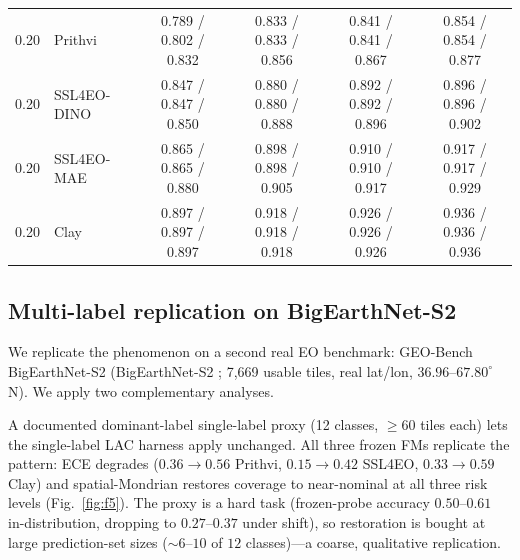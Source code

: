 \documentclass[preprint,11pt,authoryear]{elsarticle}
\begin{document}
\begin{table}[htbp]
{\begin{tabular}{clcccc}
\midrule
0.20 & Prithvi & 0.789 / 0.802 / 0.832\rlap{$^{\dagger}$} & 0.833 / 0.833 / 0.856\rlap{$^{\dagger}$} & 0.841 / 0.841 / 0.867\rlap{$^{\dagger}$} & 0.854 / 0.854 / 0.877\rlap{$^{\dagger}$} \\
0.20 & SSL4EO-DINO & 0.847 / 0.847 / 0.850\rlap{$^{\dagger}$} & 0.880 / 0.880 / 0.888\rlap{$^{\dagger}$} & 0.892 / 0.892 / 0.896\rlap{$^{\dagger}$} & 0.896 / 0.896 / 0.902\rlap{$^{\dagger}$} \\
0.20 & SSL4EO-MAE & 0.865 / 0.865 / 0.880\rlap{$^{\dagger}$} & 0.898 / 0.898 / 0.905\rlap{$^{\dagger}$} & 0.910 / 0.910 / 0.917\rlap{$^{\dagger}$} & 0.917 / 0.917 / 0.929\rlap{$^{\dagger}$} \\
0.20 & Clay & 0.897 / 0.897 / 0.897\rlap{$^{\dagger}$} & 0.918 / 0.918 / 0.918\rlap{$^{\dagger}$} & 0.926 / 0.926 / 0.926\rlap{$^{\dagger}$} & 0.936 / 0.936 / 0.936\rlap{$^{\dagger}$} \\
\bottomrule
\end{tabular}}
\end{table}

\subsection*{Multi-label replication on BigEarthNet-S2}
We replicate the phenomenon on a second real EO benchmark: GEO-Bench \citep{lacoste2023geobench} BigEarthNet-S2
(BigEarthNet-S2 \citep{sumbul2019bigearthnet}; 7{,}669 usable tiles, real lat/lon, $36.96$--$67.80^\circ$N). We apply two complementary
analyses.

A documented dominant-label single-label proxy (12 classes, $\ge60$ tiles each)
lets the single-label LAC harness apply unchanged. All three frozen FMs replicate the pattern: ECE degrades
($0.36\to0.56$ Prithvi, $0.15\to0.42$ SSL4EO, $0.33\to0.59$ Clay) and spatial-Mondrian restores coverage
to near-nominal at all three risk levels (Fig.~\ref{fig:f5}). The proxy is a hard task (frozen-probe accuracy $0.50$--$0.61$
in-distribution, dropping to $0.27$--$0.37$ under shift), so restoration is bought at large prediction-set
sizes (${\sim}6$--$10$ of $12$ classes)---a coarse, qualitative replication.
\end{document}
